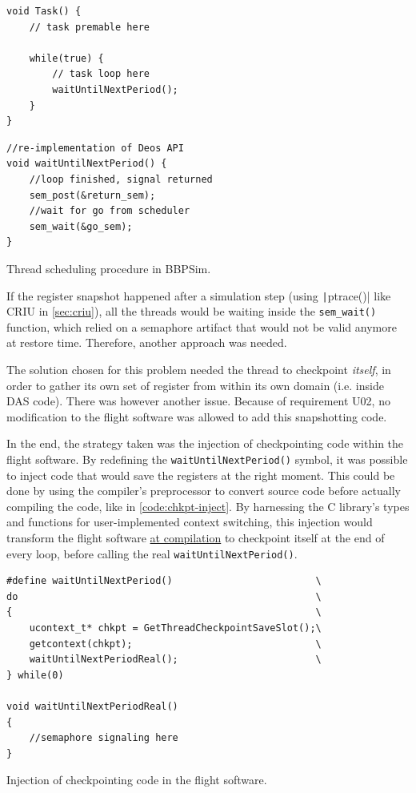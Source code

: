 \begin{listing}[htpb]
	\centering
	\begin{minipage}{.5\textwidth}
	\begin{verbatim}
void Task() {
	// task premable here
	
	while(true) {
		// task loop here
		waitUntilNextPeriod();
	}
}
	\end{verbatim}
	\end{minipage}%
	\begin{minipage}{.5\textwidth}
	\begin{verbatim}
//re-implementation of Deos API
void waitUntilNextPeriod() {
	//loop finished, signal returned
	sem_post(&return_sem);
	//wait for go from scheduler 
	sem_wait(&go_sem);
}
	\end{verbatim}
	\end{minipage}
	\caption{Thread scheduling procedure in BBPSim.}
	\label{code:thr-sched-bbpsim}
\end{listing}

If the register snapshot happened after a simulation step (using \texttt|ptrace()| like \gls{CRIU} in \autoref{sec:criu}), all the threads would be waiting inside the \texttt{sem_wait()} function, which relied on a semaphore artifact that would not be valid anymore at restore time. Therefore, another approach was needed.

The solution chosen for this problem needed the thread to checkpoint \textit{itself}, in order to gather its own set of register from within its own domain (i.e. inside DAS code). There was however another issue. Because of requirement U02, no modification to the flight software was allowed to add this snapshotting code. 

In the end, the strategy taken was the injection of checkpointing code within the flight software. By redefining the \texttt{waitUntilNextPeriod()} symbol, it was possible to inject code that would save the registers at the right moment. This could be done by using the compiler's preprocessor to convert source code before actually compiling the code, like in \autoref{code:chkpt-inject}. By harnessing the C library's types and functions for user-implemented context switching\cite{online:getcontext}, this injection would transform the flight software \ul{at compilation} to checkpoint itself at the end of every loop, before calling the real \texttt{waitUntilNextPeriod()}. 
\begin{listing}[htpb]
	\centering
	\begin{verbatim}
#define waitUntilNextPeriod()                         \
do                                                    \
{                                                     \
	ucontext_t* chkpt = GetThreadCheckpointSaveSlot();\
	getcontext(chkpt);                                \
	waitUntilNextPeriodReal();                        \ 
} while(0)

void waitUntilNextPeriodReal()
{
	//semaphore signaling here
}
	\end{verbatim}
	\caption{Injection of checkpointing code in the flight software.}
	\label{code:chkpt-inject}
\end{listing}

